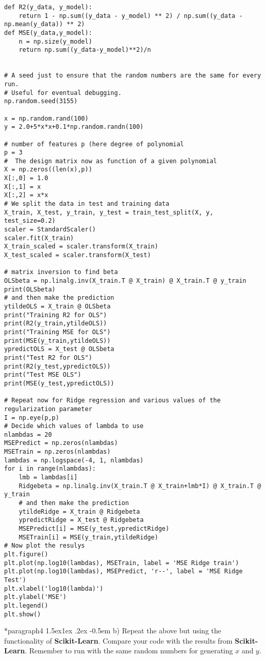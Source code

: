 \documentclass[%
oneside,                 %
final,                   %
10pt]{article}
\makeatletter
\newenvironment{doconceexercise}{}{}
\newcommand\subex{\@startsection*{paragraph}{4}{\z@}%
                  {1.5ex\@plus1ex \@minus.2ex}%
                  {-0.5em}%
                  {\normalfont\normalsize\bfseries}}
\makeatother
\begin{document}
\begin{doconceexercise}
\begin{verbatim}
def R2(y_data, y_model):
    return 1 - np.sum((y_data - y_model) ** 2) / np.sum((y_data - np.mean(y_data)) ** 2)
def MSE(y_data,y_model):
    n = np.size(y_model)
    return np.sum((y_data-y_model)**2)/n


# A seed just to ensure that the random numbers are the same for every run.
# Useful for eventual debugging.
np.random.seed(3155)

x = np.random.rand(100)
y = 2.0+5*x*x+0.1*np.random.randn(100)

# number of features p (here degree of polynomial
p = 3
#  The design matrix now as function of a given polynomial
X = np.zeros((len(x),p))
X[:,0] = 1.0
X[:,1] = x
X[:,2] = x*x
# We split the data in test and training data
X_train, X_test, y_train, y_test = train_test_split(X, y, test_size=0.2)
scaler = StandardScaler()
scaler.fit(X_train)
X_train_scaled = scaler.transform(X_train)
X_test_scaled = scaler.transform(X_test)

# matrix inversion to find beta
OLSbeta = np.linalg.inv(X_train.T @ X_train) @ X_train.T @ y_train
print(OLSbeta)
# and then make the prediction
ytildeOLS = X_train @ OLSbeta
print("Training R2 for OLS")
print(R2(y_train,ytildeOLS))
print("Training MSE for OLS")
print(MSE(y_train,ytildeOLS))
ypredictOLS = X_test @ OLSbeta
print("Test R2 for OLS")
print(R2(y_test,ypredictOLS))
print("Test MSE OLS")
print(MSE(y_test,ypredictOLS))

# Repeat now for Ridge regression and various values of the regularization parameter
I = np.eye(p,p)
# Decide which values of lambda to use
nlambdas = 20
MSEPredict = np.zeros(nlambdas)
MSETrain = np.zeros(nlambdas)
lambdas = np.logspace(-4, 1, nlambdas)
for i in range(nlambdas):
    lmb = lambdas[i]
    Ridgebeta = np.linalg.inv(X_train.T @ X_train+lmb*I) @ X_train.T @ y_train
    # and then make the prediction
    ytildeRidge = X_train @ Ridgebeta
    ypredictRidge = X_test @ Ridgebeta
    MSEPredict[i] = MSE(y_test,ypredictRidge)
    MSETrain[i] = MSE(y_train,ytildeRidge)
# Now plot the resulys
plt.figure()
plt.plot(np.log10(lambdas), MSETrain, label = 'MSE Ridge train')
plt.plot(np.log10(lambdas), MSEPredict, 'r--', label = 'MSE Ridge Test')
plt.xlabel('log10(lambda)')
plt.ylabel('MSE')
plt.legend()
plt.show()
\end{verbatim}

\subex{b)}
Repeat the above but using the functionality of \textbf{Scikit-Learn}. Compare your code with the results from \textbf{Scikit-Learn}. Remember to run with the same random numbers for generating $x$ and $y$.



\end{doconceexercise}
\end{document}
